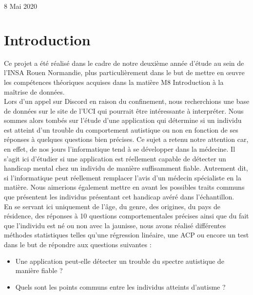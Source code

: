 \documentclass[12,french]{report}
\begin{document}
\begin{titlepage}
\begin{center}
	\vfill
	{\large 8 Mai 2020}
\end{center}
\end{titlepage}

\tableofcontents

\renewcommand{\chaptername}{}
\chapter*{Introduction}


    Ce projet a été réalisé dans le cadre de notre deuxième année d’étude au sein de l’INSA Rouen Normandie, plus particulièrement dans le but de mettre en œuvre les compétences théoriques acquises dans la matière M8 Introduction à la maîtrise de données.\\

Lors d’un appel sur Discord en raison du confinement, nous recherchions une base de données sur le site de l’UCI qui pourrait être intéressante à interpréter. Nous sommes alors tombés sur l’étude d’une application qui détermine si un individu est atteint d’un trouble du comportement autistique ou non en fonction de ses réponses à quelques questions bien précises. Ce sujet a retenu notre attention car, en effet, de nos jours l’informatique tend à se développer dans la médecine. Il s’agit ici d’étudier si une application est réellement capable de détecter un handicap mental chez un individu de manière suffisamment fiable. Autrement dit, si l’informatique peut réellement remplacer l’avis d’un médecin spécialiste en la matière. Nous aimerions également mettre en avant les possibles traits communs que présentent les individus présentant cet handicap avéré dans l’échantillon.\\

    En se servant ici uniquement de l’âge, du genre, des origines, du pays de résidence, des réponses à 10 questions comportementales précises ainsi que du fait que l’individu est né ou non avec la jaunisse, nous avons réalisé différentes méthodes statistiques telles qu’une régression linéaire, une ACP ou encore un test dans le but de répondre aux questions suivantes :
\vspace{0.2cm}
\begin{itemize}[label=\textbullet]
	\item Une application peut-elle détecter un trouble du spectre 					autistique de manière fiable ?
	\item Quels sont les points communs entre les individus atteints 				d’autisme ?
\end{itemize}
\end{document}

